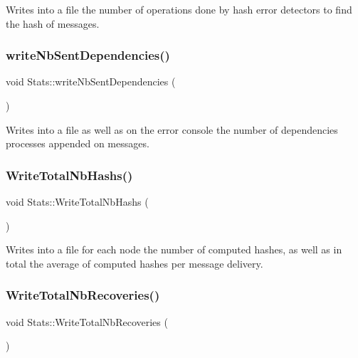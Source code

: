 Writes into a file the number of operations done by hash error detectors to find the hash of messages. 

\mbox{\label{class_stats_a5e7dc3debec2bdc35b11e713283ab0b3}} 
\subsubsection{\texorpdfstring{write\+Nb\+Sent\+Dependencies()}{writeNbSentDependencies()}}
{\footnotesize\ttfamily void Stats\+::write\+Nb\+Sent\+Dependencies (\begin{DoxyParamCaption}{ }\end{DoxyParamCaption})\hspace{0.3cm}{\ttfamily [private]}}



Writes into a file as well as on the error console the number of dependencies processes appended on messages. 

\mbox{\label{class_stats_a89cedfe36937b0f9a5f525a8858e54f2}} 
\subsubsection{\texorpdfstring{Write\+Total\+Nb\+Hashs()}{WriteTotalNbHashs()}}
{\footnotesize\ttfamily void Stats\+::\+Write\+Total\+Nb\+Hashs (\begin{DoxyParamCaption}{ }\end{DoxyParamCaption})\hspace{0.3cm}{\ttfamily [private]}}



Writes into a file for each node the number of computed hashes, as well as in total the average of computed hashes per message delivery. 

\mbox{\label{class_stats_a75689d1481b0605ce74d775e36c21740}} 
\subsubsection{\texorpdfstring{Write\+Total\+Nb\+Recoveries()}{WriteTotalNbRecoveries()}}
{\footnotesize\ttfamily void Stats\+::\+Write\+Total\+Nb\+Recoveries (\begin{DoxyParamCaption}{ }\end{DoxyParamCaption})\hspace{0.3cm}{\ttfamily [private]}}



